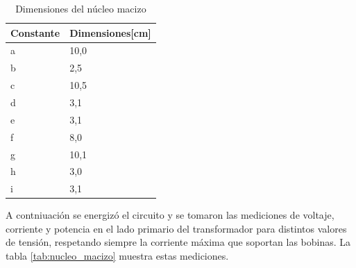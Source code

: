 \begin{table}[H]
\centering
\caption{Dimensiones del núcleo macizo}
\begin{tabularx}{0.8\textwidth}{|X|X|}
\hline
 Constante  &   Dimensiones[cm] \\ \hline
     a      &       10,0 \\ \hline
     b      &       2,5 \\ \hline
     c      &       10,5 \\ \hline
     d      &       3,1 \\ \hline
     e      &       3,1 \\ \hline
     f      &       8,0  \\ \hline
     g      &       10,1 \\ \hline
     h      &       3,0 \\ \hline
     i      &       3,1 \\ \hline
\end{tabularx}
\label{Dimensiones del núcleo macizo}
\end{table}

\vspace{1em}

A contniuación se energizó el circuito y se tomaron las mediciones de voltaje, corriente y potencia en el lado primario del transformador para distintos valores de tensión, respetando siempre la corriente máxima que soportan las bobinas. La tabla \ref{tab:nucleo_macizo} muestra estas mediciones.

